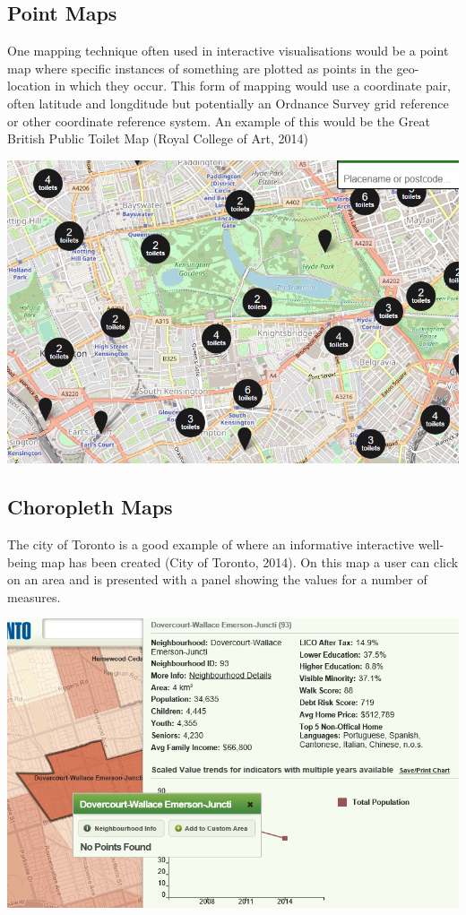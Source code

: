 \subsection{Point Maps}
One mapping technique often used in interactive visualisations would be a point map where specific instances of something are plotted as points in the geo-location in which they occur. This form of mapping would use a coordinate pair, often latitude and longditude but potentially an Ordnance Survey grid reference or other coordinate reference system. An example of this would be the Great British Public Toilet Map (Royal College of Art, 2014)

\includegraphics[scale=0.5]{figures/toilets_point} %


\subsection{Choropleth Maps}
The city of Toronto is a good example of where an informative interactive well-being map has been created (City of Toronto, 2014). On this map a user can click on an area and is presented with a panel showing the values for a number of measures.

\includegraphics[scale=0.5]{figures/toronto_choropleth} %

